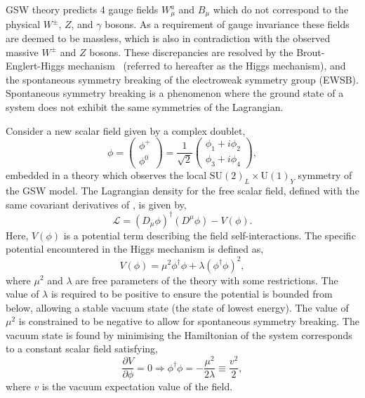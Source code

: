 GSW theory predicts 4 gauge fields $W^a_\mu$ and $B_\mu$ which do not correspond to the physical $W^\pm$, $Z$, and $\gamma$ bosons.
As a requirement of gauge invariance these fields are deemed to be massless, which is also in contradiction with the observed massive $W^\pm$ and $Z$ bosons.
These discrepancies are resolved by the Brout-Englert-Higgs mechanism~\cite{Higgs1, Higgs2, Higgs3} (referred to hereafter as the Higgs mechanism), and the spontaneous symmetry breaking of the electroweak symmetry group (EWSB).
Spontaneous symmetry breaking is a phenomenon where the ground state of a system does not exhibit the same symmetries of the Lagrangian.

Consider a new scalar field given by a complex doublet,
\begin{equation}
	\phi = \begin{pmatrix} \phi^+ \\ \phi^0 \end{pmatrix} = \frac{1}{\sqrt{2}} \begin{pmatrix} \phi_1 + i \phi_2 \\ \phi_3 + i \phi_4 \end{pmatrix},
\end{equation}
embedded in a theory which observes the local $\text{SU}(2)_L \times \text{U}(1)_Y$ symmetry of the GSW model.
The Lagrangian density for the free scalar field, defined with the same covariant derivatives of , is given by,
\begin{equation}
	\label{eq:higgs_lagrangian}
	\mathcal{L} = (D_\mu \phi)^\dagger (D^\mu \phi) - V(\phi).
\end{equation}
Here, $V(\phi)$ is a potential term describing the field self-interactions.
The specific potential encountered in the Higgs mechanism is defined as,
\begin{equation}
	\label{eq:higgs_potential}
	V(\phi) = \mu^2 \phi^\dagger \phi + \lambda (\phi^\dagger \phi)^2,
\end{equation}
where $\mu^2$ and $\lambda$ are free parameters of the theory with some restrictions.
The value of $\lambda$ is required to be positive to ensure the potential is bounded from below, allowing a stable vacuum state (the state of lowest energy).
The value of $\mu^2$ is constrained to be negative to allow for spontaneous symmetry breaking.
The vacuum state is found by minimising the Hamiltonian of the system corresponds to a constant scalar field satisfying,
\begin{equation}
	\frac{\partial V}{\partial \phi} = 0 \Longrightarrow  \phi^\dagger \phi = -\frac{\mu^2}{2\lambda} \equiv \frac{v^2}{2},
\end{equation}
where $v$ is the vacuum expectation value of the field.

